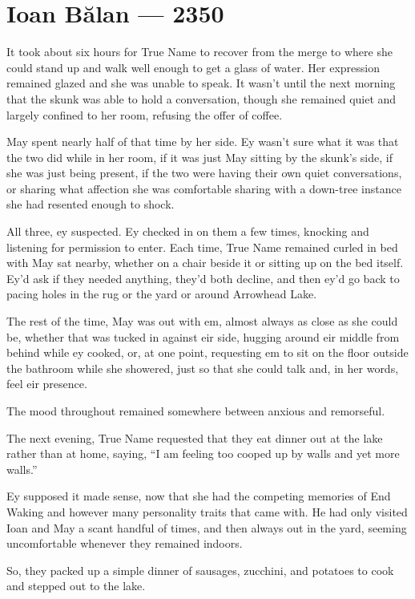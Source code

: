 \hypertarget{ioan-bux103lan-2350}{%
\chapter{Ioan Bălan — 2350}\label{ioan-bux103lan-2350}}

It took about six hours for True Name to recover from the merge to where she could stand up and walk well enough to get a glass of water. Her expression remained glazed and she was unable to speak. It wasn't until the next morning that the skunk was able to hold a conversation, though she remained quiet and largely confined to her room, refusing the offer of coffee.

May spent nearly half of that time by her side. Ey wasn't sure what it was that the two did while in her room, if it was just May sitting by the skunk's side, if she was just being present, if the two were having their own quiet conversations, or sharing what affection she was comfortable sharing with a down-tree instance she had resented enough to shock.

All three, ey suspected. Ey checked in on them a few times, knocking and listening for permission to enter. Each time, True Name remained curled in bed with May sat nearby, whether on a chair beside it or sitting up on the bed itself. Ey'd ask if they needed anything, they'd both decline, and then ey'd go back to pacing holes in the rug or the yard or around Arrowhead Lake.

The rest of the time, May was out with em, almost always as close as she could be, whether that was tucked in against eir side, hugging around eir middle from behind while ey cooked, or, at one point, requesting em to sit on the floor outside the bathroom while she showered, just so that she could talk and, in her words, feel eir presence.

The mood throughout remained somewhere between anxious and remorseful.

The next evening, True Name requested that they eat dinner out at the lake rather than at home, saying, ``I am feeling too cooped up by walls and yet more walls.''

Ey supposed it made sense, now that she had the competing memories of End Waking and however many personality traits that came with. He had only visited Ioan and May a scant handful of times, and then always out in the yard, seeming uncomfortable whenever they remained indoors.

So, they packed up a simple dinner of sausages, zucchini, and potatoes to cook and stepped out to the lake.

